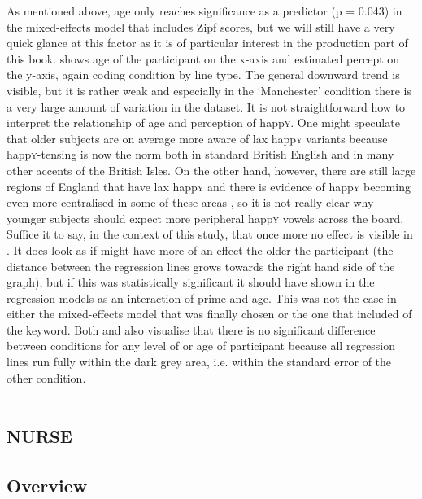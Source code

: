 As mentioned above, age only reaches significance as a predictor (p = 0.043) in the mixed-effects model that includes Zipf scores, but we will still have a very quick glance at this factor as it is of particular interest in the production part of this book.
 shows age of the participant on the x-axis and estimated percept on the y-axis, again coding  condition by line type.
The general downward trend is visible, but it is rather weak and especially in the `Manchester' condition there is a very large amount of variation in the dataset.
It is not straightforward how to interpret the relationship of age and perception of happ\textsc{y}.
One might speculate that older subjects are on average more aware of lax happ\textsc{y} variants because happ\textsc{y}-tensing is now the norm both in standard British English and in many other accents of the British Isles.
On the other hand, however, there are still large regions of England that have lax happ\textsc{y} and there is evidence of happ\textsc{y} becoming even more centralised in some of these areas \parencite[cf.][]{flynn2010}, so it is not really clear why younger subjects should expect more peripheral happ\textsc{y} vowels across the board.
Suffice it to say, in the context of this study, that once more no  effect is visible in .
It does look as if  might have more of an effect the older the participant (the distance between the regression lines grows towards the right hand side of the graph), but if this was statistically significant it should have shown in the regression models as an interaction of prime and age.
This was not the case in either the mixed-effects model that was finally chosen or the one that included  of the keyword.
Both  and  also visualise that there is no significant difference between  conditions for any level of  or age of participant because all regression lines run fully within the dark grey area, i.e. within the standard error of the other condition.

\section{\textsc{nurse}}
\label{sec.perc_res.nurse}	
	\subsection{Overview}
	\label{sec.perc_res.nurse.overview}

